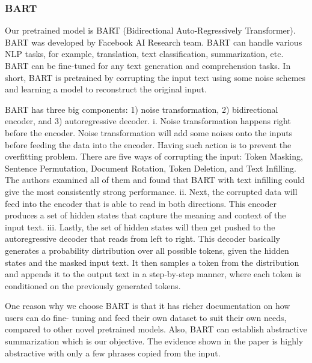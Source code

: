 \subsubsection{BART}


Our pretrained model is BART (Bidirectional Auto-Regressively Transformer). BART was developed by Facebook AI Research team. BART can handle various NLP tasks, for example, translation, text classification, summarization, etc. BART can be fine-tuned for any text generation and comprehension tasks. In short, BART is pretrained by corrupting the input text using some noise schemes and learning a model to reconstruct the original input.




BART has three big components: 1) noise transformation, 2) bidirectional encoder, and 3) autoregressive decoder.
i.	Noise transformation happens right before the encoder. Noise transformation will add some noises onto the inputs before feeding the data into the encoder. Having such action is to prevent the overfitting problem. There are five ways of corrupting the input: Token Masking, Sentence Permutation, Document Rotation, Token Deletion, and Text Infilling. The authors examined all of them and found that BART with text infilling could give the most consistently strong performance.
ii.	Next, the corrupted data will feed into the encoder that is able to read in both directions. This encoder produces a set of hidden states that capture the meaning and context of the input text.
iii.	Lastly, the set of hidden states will then get pushed to the autoregressive decoder that reads from left to right. This decoder basically generates a probability distribution over all possible tokens, given the hidden states and the masked input text. It then samples a token from the distribution and appends it to the output text in a step-by-step manner, where each token is conditioned on the previously generated tokens.

One reason why we choose BART is that it has richer documentation on how users can do fine- tuning and feed their own dataset to suit their own needs, compared to other novel pretrained models. Also, BART can establish abstractive summarization which is our objective. The evidence shown in the paper is highly abstractive with only a few phrases copied from the input.



